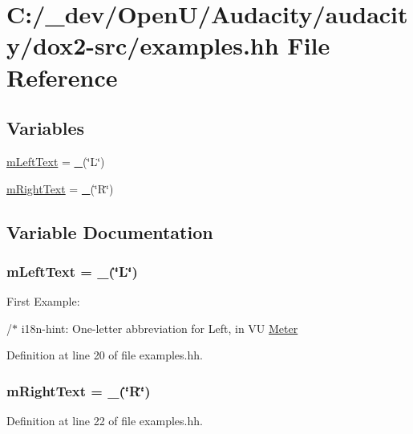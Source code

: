 \hypertarget{examples_8hh}{}\section{C\+:/\+\_\+dev/\+Open\+U/\+Audacity/audacity/dox2-\/src/examples.hh File Reference}
\label{examples_8hh}
\subsection*{Variables}
\begin{DoxyCompactItemize}
\item 
\hyperlink{examples_8hh_a400f51b46002d9bcf9c273377323e73c}{m\+Left\+Text} = \hyperlink{vr32_8c_ae4dfd7b0d66121016d6466d2ff10e8ba}{\+\_\+}(\char`\"{}L\char`\"{})
\item 
\hyperlink{examples_8hh_af4c75b55e54f340dd747ba60ecdbeda1}{m\+Right\+Text} = \hyperlink{vr32_8c_ae4dfd7b0d66121016d6466d2ff10e8ba}{\+\_\+}(\char`\"{}R\char`\"{})
\end{DoxyCompactItemize}


\subsection{Variable Documentation}
\subsubsection[{\texorpdfstring{m\+Left\+Text}{mLeftText}}]{\setlength{\rightskip}{0pt plus 5cm}m\+Left\+Text = {\bf \+\_\+}(\char`\"{}L\char`\"{})}\hypertarget{examples_8hh_a400f51b46002d9bcf9c273377323e73c}{}\label{examples_8hh_a400f51b46002d9bcf9c273377323e73c}
First Example\+:

/$\ast$ i18n-\/hint\+: One-\/letter abbreviation for Left, in VU \hyperlink{class_meter}{Meter} 

Definition at line 20 of file examples.\+hh.

\subsubsection[{\texorpdfstring{m\+Right\+Text}{mRightText}}]{\setlength{\rightskip}{0pt plus 5cm}m\+Right\+Text = {\bf \+\_\+}(\char`\"{}R\char`\"{})}\hypertarget{examples_8hh_af4c75b55e54f340dd747ba60ecdbeda1}{}\label{examples_8hh_af4c75b55e54f340dd747ba60ecdbeda1}


Definition at line 22 of file examples.\+hh.


